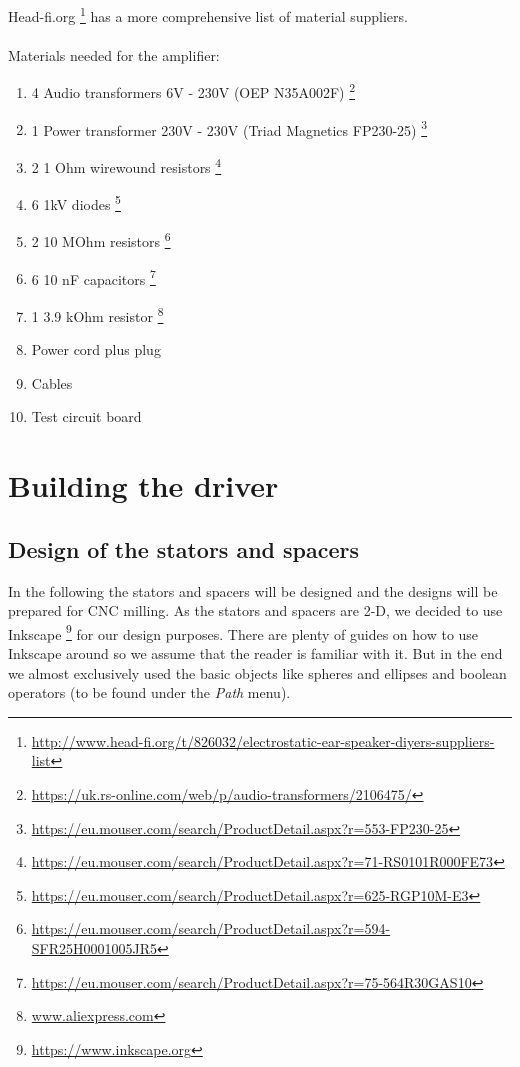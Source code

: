 \documentclass{article}
\begin{document}
Head-fi.org \footnote{\url{http://www.head-fi.org/t/826032/electrostatic-ear-speaker-diyers-suppliers-list}} has a more comprehensive list of material suppliers.
\\
\\
Materials needed for the amplifier:
\begin{enumerate}
    \item 4 Audio transformers 6V - 230V (OEP N35A002F) \footnote{\url{https://uk.rs-online.com/web/p/audio-transformers/2106475/}}
    \item 1 Power transformer 230V - 230V (Triad Magnetics FP230-25) \footnote{\url{https://eu.mouser.com/search/ProductDetail.aspx?r=553-FP230-25}}
    \item 2 1 Ohm wirewound resistors \footnote{\url{https://eu.mouser.com/search/ProductDetail.aspx?r=71-RS0101R000FE73}}
    \item 6 1kV diodes \footnote{\url{https://eu.mouser.com/search/ProductDetail.aspx?r=625-RGP10M-E3}}
    \item 2 10 MOhm resistors \footnote{\url{https://eu.mouser.com/search/ProductDetail.aspx?r=594-SFR25H0001005JR5}}
    \item 6 10 nF capacitors \footnote{\url{https://eu.mouser.com/search/ProductDetail.aspx?r=75-564R30GAS10}}
    \item 1 3.9 kOhm resistor \footnote{\url{www.aliexpress.com}}
    \item Power cord plus plug
    \item Cables
    \item Test circuit board
\end{enumerate}

\section{Building the driver}
\label{s:driver}

\subsection{Design of the stators and spacers}
\label{s:driver:design}
In the following the stators and spacers will be designed and the designs will be prepared for CNC milling. As the stators and spacers are 2-D, we decided to use Inkscape \footnote{\url{https://www.inkscape.org}} for our design purposes. There are plenty of guides on how to use Inkscape around so we assume that the reader is familiar with it. But in the end we almost exclusively used the basic objects like spheres and ellipses and boolean operators (to be found under the \textit{Path} menu).
\end{document}
